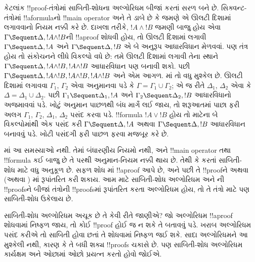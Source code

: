 \documentclass[../../../include/open-logic-section]{subfiles}
\begin{document}
કેટલાંક
!!{proof}-તંત્રોમાં
સાબિતી-શોધના
અલ્ગોરિધમ
બીજાં કરતાં
સરળ બને છે.
સિક્વન્ટ-તંત્રોમાં
!!a{formula}નો
!!{main operator}
અને તે ડાબે
છે કે જમણે
એ ઊલટી
દિશામાં લગાવવાનો
નિયમ નક્કી
કરે છે.
દાખલા તરીકે,
$!A \land
!B$ જમણી
બાજુ હોય એવા
$\Gamma \Sequent \Delta, !A \land !B$ની
!!a{proof}
શોધવી હોય,
તો
\RightR{\land}
ઊલટી દિશામાં
લગાવી
$\Gamma \Sequent \Delta, !A$
અને
$\Gamma \Sequent \Delta, !B$
એ બે અનુરૂપ
આધારવિધાન
મેળવવાં.
પણ તંત્ર
હોય તો
સંકોચનને લીધે
વિકલ્પો વધે
છે: તમે
\RightR{\Contraction}
ઊલટી દિશામાં
લગાવી તેના
સ્થાને
$\Gamma \Sequent \Delta, !A \land
!B, !A \land !B$
આધારવિધાન
પણ બનાવી
શકો. પછી
$\Gamma \Sequent
\Delta, !A \land !B, !A \land !B, !A \land !B$
અને એમ
આગળ.
માં
તો વધુ
મુશ્કેલ છે.
\RightR{\land}
ઊલટી દિશામાં
લગાવવા
$\Gamma_1$,
$\Gamma_2$
એવા અનુમાનવા
પડે કે
$\Gamma
= \Gamma_1 \cup \Gamma_2$;
એ જ રીતે
$\Delta_1$,
$\Delta_2$
એવા કે
$\Delta
= \Delta_1 \cup \Delta_2$.
પછી
$\Gamma_1 \Sequent \Delta_1, !A$
અને
$\Gamma_2 \Sequent \Delta_2, !B$
આધારવિધાનો
અજમાવવાં
પડે. ખોટું
અનુમાન પાછળથી
બંધ માર્ગે
લઈ જાય,
તો શરૂઆતમાં
પાછા ફરી
અલગ
$\Gamma_1$,
$\Gamma_2$,
$\Delta_1$,
$\Delta_2$
પસંદ કરવા
પડે.
!!{formula}
$!A \lor !B$
હોય તો
\RightR{\lor}
માટેના બે
વિકલ્પોમાંથી
એક પસંદ
કરી
$\Gamma \Sequent \Delta,
!A$
અથવા
$\Gamma \Sequent \Delta, !B$
આધારવિધાન
બનાવવું પડે.
ખોટી પસંદગી
ફરી પાછળ
ફરવા મજબૂર
કરે છે.

માં
આ સમસ્યાઓ
નથી. તેમાં
બંધારણીય
નિયમો નથી,
અને !!{main operator}
તથા !!{formula}
કઈ બાજુ છે
તે પરથી
અનુમાન-નિયમ
નક્કી થાય
છે. તેથી
 કે
 કરતાં
સાબિતી-શોધ
માટે વધુ
અનુકૂળ છે.
સફળ શોધ
માં
!!a{proof}
આપે છે,
અને પછી
તે !!{proof}ને
અથવા
(અથવા
)
માં રૂપાંતરિત
કરી શકાય.
આમ 
માટે સાબિતી-શોધ
અલ્ગોરિધમ
અને
ની
!!{proof}sને
બીજાં તંત્રોની
!!{proof}sમાં
રૂપાંતરિત
કરતા અલ્ગોરિધમ
હોય, તો
તે તંત્રો
માટે પણ
સાબિતી-શોધ
ઉકેલાય છે.

સાબિતી-શોધ
અલ્ગોરિધમ
અચૂક છે
તે કેવી
રીતે જાણીએ?
જો અલ્ગોરિધમ
!!a{proof}
શોધવામાં
નિષ્ફળ જાય,
તો કોઈ
!!{proof}
હોઈ જ
ન શકે
તે બતાવવું
પડે. ખરાબ
અલ્ગોરિધમ
પસંદ કરીએ
તો સાબિતી
હોવા છતાં
તે શોધવામાં
નિષ્ફળ જઈ
શકે. સાદા
અલ્ગોરિધમને
આ મુશ્કેલી
નથી, કારણ
કે તે
બધી શક્ય
!!{proof}s
ચકાસે છે.
પણ સાબિતી-શોધ
અલ્ગોરિધમ
કાર્યક્ષમ
અને ઓછામાં
ઓછો પ્રયત્ન
કરતો હોવો
જોઈએ.
\end{document}
